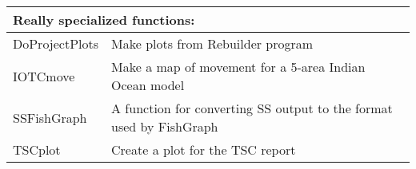 \begin{center}
\begin{longtable}{p{4.5cm} p{10.52cm}}
		\hline
		\multicolumn{2}{l}{Really specialized functions:} \Tstrut\Bstrut\\
		\hline
		DoProjectPlots \Tstrut & Make plots from Rebuilder program \\
		IOTCmove       \Tstrut & Make a map of movement for a 5-area Indian Ocean model \\
		SSFishGraph    \Tstrut & A function for converting SS output to the format used by FishGraph \\
		TSCplot        \Tstrut & Create a plot for the TSC report \Bstrut\\
		\hline
	\end{longtable}
\end{center}
